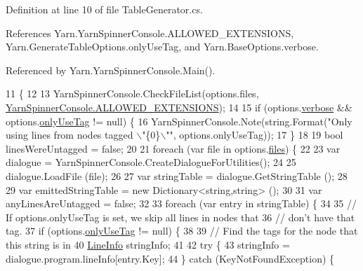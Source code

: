 Definition at line 10 of file Table\-Generator.\-cs.



References Yarn.\-Yarn\-Spinner\-Console.\-A\-L\-L\-O\-W\-E\-D\-\_\-\-E\-X\-T\-E\-N\-S\-I\-O\-N\-S, Yarn.\-Generate\-Table\-Options.\-only\-Use\-Tag, and Yarn.\-Base\-Options.\-verbose.



Referenced by Yarn.\-Yarn\-Spinner\-Console.\-Main().


\begin{DoxyCode}
11         \{
12 
13             YarnSpinnerConsole.CheckFileList(options.files, 
      \hyperlink{a00189_a0979de7ea02c8c0375b8220a12e6575e}{YarnSpinnerConsole.ALLOWED\_EXTENSIONS});
14 
15             \textcolor{keywordflow}{if} (options.\hyperlink{a00035_ada4d83d1756918f362d55f6649b82b17}{verbose} && options.\hyperlink{a00101_a8b30c1b7fb1b74eae455a568c1024b3d}{onlyUseTag} != null) \{
16                 YarnSpinnerConsole.Note(string.Format(\textcolor{stringliteral}{"Only using lines from nodes tagged \(\backslash\)"\{0\}\(\backslash\)""}, 
      options.onlyUseTag));
17             \}
18 
19             \textcolor{keywordtype}{bool} linesWereUntagged = \textcolor{keyword}{false};
20 
21             \textcolor{keywordflow}{foreach} (var file \textcolor{keywordflow}{in} options.\hyperlink{a00035_aa93cbb1bc1d5328e0a417012621e92d2}{files}) \{
22 
23                 var dialogue = YarnSpinnerConsole.CreateDialogueForUtilities();
24 
25                 dialogue.LoadFile (file);
26 
27                 var stringTable = dialogue.GetStringTable ();
28 
29                 var emittedStringTable = \textcolor{keyword}{new} Dictionary<string,string> ();
30 
31                 var anyLinesAreUntagged = \textcolor{keyword}{false};
32 
33                 \textcolor{keywordflow}{foreach} (var entry \textcolor{keywordflow}{in} stringTable) \{
34 
35                     \textcolor{comment}{// If options.onlyUseTag is set, we skip all lines in nodes that}
36                     \textcolor{comment}{// don't have that tag.}
37                     \textcolor{keywordflow}{if} (options.\hyperlink{a00101_a8b30c1b7fb1b74eae455a568c1024b3d}{onlyUseTag} != null) \{
38 
39                         \textcolor{comment}{// Find the tags for the node that this string is in}
40                         \hyperlink{a00125}{LineInfo} stringInfo;
41 
42                         \textcolor{keywordflow}{try} \{
43                             stringInfo = dialogue.program.lineInfo[entry.Key];
44                         \} \textcolor{keywordflow}{catch} (KeyNotFoundException) \{

\end{DoxyCode}
